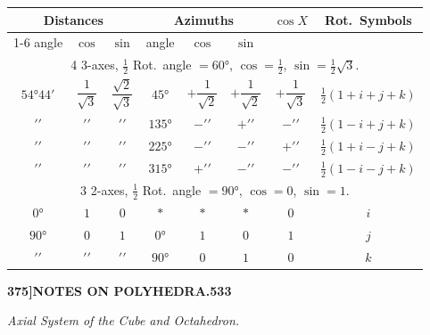 \documentclass[11pt,a4paper]{article}
\begin{document}
\begin{center}
\small
\begin{tabular}{|c|c|c|c|c|c|c|c|}
\hline
\multicolumn{3}{|c|}{Distances} & \multicolumn{3}{c|}{Azimuths} & \multirow{2}{*}{$\cos X$} & \multirow{2}{*}{Rot.~Symbols} \\
\cline{1-6}
angle & $\cos$ & $\sin$ & angle & $\cos$ & $\sin$ & & \\
\hline
\multicolumn{8}{c}{4 3-axes, $\tfrac{1}{2}$ Rot.~angle $= 60°$, $\cos = \tfrac{1}{2}$, $\sin = \tfrac{1}{2}\surd 3$.} \\
\hline
$54°44'$ & $\dfrac{1}{\surd 3}$ & $\dfrac{\surd 2}{\surd 3}$ & $45°$ & $+\dfrac{1}{\surd 2}$ & $+\dfrac{1}{\surd 2}$ & $+\dfrac{1}{\surd 3}$ & $\tfrac{1}{2}(1 + i + j + k)$ \\
$\prime\prime$ & $\prime\prime$ & $\prime\prime$ & $135°$ & $-\prime\prime$ & $+\prime\prime$ & $-\prime\prime$ & $\tfrac{1}{2}(1 - i + j + k)$ \\
$\prime\prime$ & $\prime\prime$ & $\prime\prime$ & $225°$ & $-\prime\prime$ & $-\prime\prime$ & $+\prime\prime$ & $\tfrac{1}{2}(1 + i - j + k)$ \\
$\prime\prime$ & $\prime\prime$ & $\prime\prime$ & $315°$ & $+\prime\prime$ & $-\prime\prime$ & $-\prime\prime$ & $\tfrac{1}{2}(1 - i - j + k)$ \\
\hline
\multicolumn{8}{c}{3 2-axes, $\tfrac{1}{2}$ Rot.~angle $= 90°$, $\cos = 0$, $\sin = 1$.} \\
\hline
$0°$ & $1$ & $0$ & $*$ & $*$ & $*$ & $0$ & $i$ \\
$90°$ & $0$ & $1$ & $0°$ & $1$ & $0$ & $1$ & $j$ \\
$\prime\prime$ & $\prime\prime$ & $\prime\prime$ & $90°$ & $0$ & $1$ & $0$ & $k$ \\
\hline
\end{tabular}
\end{center}

\newpage
\begin{flushright}
\textbf{375]\hspace{1em}NOTES ON POLYHEDRA.\hfill533}
\end{flushright}

\vspace{12pt}

\begin{center}
\textit{Axial System of the Cube and Octahedron.}
\end{center}
\end{document}
